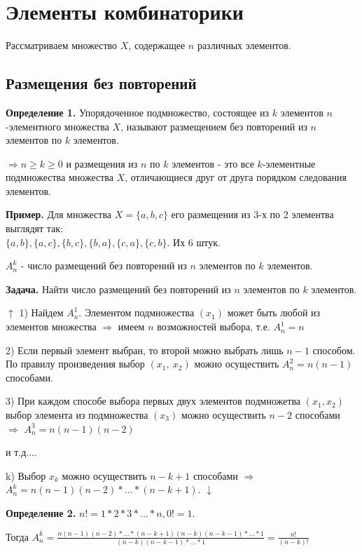 \documentclass{article}
\begin{document}
    \section{Элементы комбинаторики}
    Рассматриваем множество \(X\), содержащее \(n\) различных элементов.
    \subsection{Размещения без повторений}
    \textbf{Определение 1.} Упорядоченное подмножество, состоящее из \(k\) элементов \(n\)-элементного множества \(X\), называют размещением без повторений из \(n\) элементов по \(k\) элементов. 

    \(\Rightarrow n \ge k \ge 0\) и размещения из \(n\) по \(k\) элементов - это все \(k\)-элементные подмножества множества \(X\), отличающиеся друг от друга порядком следования элементов.

    \textbf{Пример.} Для множества \(X = \{a, b, c\}\) его размещения из 3-х по 2 элементва выглядят так:
    \\\(\{a, b\}, \{a, c\}, \{b, c\}, \{b, a\}, \{c, a\}, \{c, b\}.\) Их 6 штук.

    \(A_n^k\) - число размещений без повторений из \(n\) элементов по \(k\) элементов.

    \textbf{Задача.} Найти число размещений без повторений из \(n\) элементов по \(k\) элементов.

    \(\uparrow\) 1) Найдем \(A_n^1\). Элементом подмножества \((x_1)\) может быть любой из элементов множества \(\Rightarrow\) имеем \(n\) возможностей выбора, т.е. \(A_n^1 = n\)

    2) Если первый элемент выбран, то второй можно выбрать лишь \(n-1\) способом. По правилу произведения выбор \((x_1,\ x_2)\) можно осуществить \(A_{n}^2 = n(n-1)\) способами.

    3) При каждом способе выбора первых двух элементов подмножетва \((x_1, x_2)\) выбор элемента из подмножества \((x_3)\) можно осуществить \(n-2\) способами \(\Rightarrow\) \(A_n^3 = n(n-1)(n-2)\) 
    
    и т.д....

    k) Выбор \(x_k\) можно осуществить \(n-k+1\) способами \(\Rightarrow\) \textbf{\(A_n^k = n(n-1)(n-2)*...*(n-k+1)\)}. \(\downarrow\)

    \textbf{Определение 2.} \(n!=1*2*3*...*n, 0!=1\).

    Тогда \(A_n^k = \frac{n(n-1)(n-2)*...*(n-k+1)(n-k)(n-k-1)*...*1}{(n-k)(n-k-1)*...*1} = \frac{n!}{(n-k)!}\)
\end{document}
